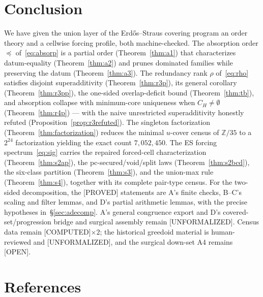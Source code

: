 \documentclass[11pt,a4paper]{article}
\theoremstyle{definition}
\begin{document}
\section{Conclusion}

We have given the union layer of the Erd\H{o}s--Straus covering program an
order theory and a cellwise forcing profile, both machine-checked.  The
absorption order $\preceq$ of~\eqref{eq:absorp} is a partial order
(Theorem~\ref{thm:a1}) that characterizes datum-equality
(Theorem~\ref{thm:a2}) and prunes dominated families while preserving the
datum (Theorem~\ref{thm:a3}).  The redundancy rank $\rho$ of~\eqref{eq:rho}
satisfies disjoint superadditivity (Theorem~\ref{thm:r3p}), its general
corollary (Theorem~\ref{thm:r3pp}), the one-sided overlap-deficit bound
(Theorem~\ref{thm:tb}), and absorption collapse with minimum-core uniqueness
when $C_H\ne\emptyset$ (Theorem~\ref{thm:r4p}) --- with the naive unrestricted superadditivity
honestly refuted (Proposition~\ref{prop:r3refuted}).  The singleton
factorization (Theorem~\ref{thm:factorization}) reduces the minimal
$u$-cover census of $\mathbb{Z}/35$ to a $2^{24}$ factorization yielding the
exact count $7{,}052{,}450$.  The ES forcing spectrum~\eqref{eq:sig} carries
the repaired forced-cell characterization (Theorem~\ref{thm:s2ap}), the
pc-secured/void/split laws (Theorem~\ref{thm:s2bcd}), the six-class
partition (Theorem~\ref{thm:s3}), and the union-max rule (Theorem~\ref{thm:s4}),
together with its complete pair-type census. For the two-sided
decomposition, the [PROVED] statements are A's finite checks, B--C's
scaling and filter lemmas, and D's partial arithmetic lemmas, with the
precise hypotheses in~\S\ref{sec:adecomp}. A's general congruence export
and D's covered-set/progression bridge and surgical assembly remain
[UNFORMALIZED]. Census data remain [COMPUTED]$\times2$; the historical
greedoid material is human-reviewed and [UNFORMALIZED], and the surgical
down-set A4 remains [OPEN].

\section{References}
\end{document}
